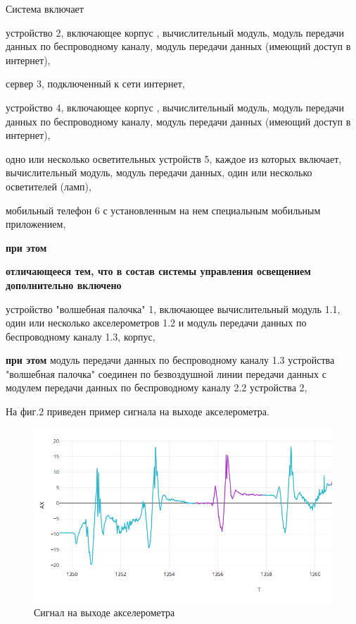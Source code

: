 Система включает 

устройство 2, включающее корпус , вычислительный модуль, модуль передачи данных по беспроводному каналу, модуль передачи данных  (имеющий доступ в интернет),   

сервер 3, подключенный к сети интернет,

устройство 4, включающее корпус , вычислительный модуль, модуль передачи данных по беспроводному каналу, модуль передачи данных  (имеющий доступ в интернет),  

одно или несколько осветительных устройств 5,   каждое из которых включает, вычислительный модуль, модуль передачи данных, один или несколько осветителей (ламп),


мобильный телефон 6 с установленным на нем специальным мобильным приложением,

\textbf{при этом}



\textbf{отличающееся тем, что в состав системы управления освещением дополнительно включено}

устройство "волшебная палочка"  1, включающее  вычислительный модуль 1.1,  один или несколько акселерометров 1.2 и модуль передачи данных по беспроводному каналу 1.3, корпус,

\textbf{при этом }
модуль передачи данных по беспроводному каналу 1.3 устройства "волшебная палочка" соединен по безвоздушной линии передачи данных с модулем передачи данных по беспроводному каналу 2.2 устройства 2,

На фиг.2  приведен пример сигнала на выходе акселерометра.

\begin{figure}[ht]
   \centering
   \includegraphics[scale=.5]{figures/AX-demo.png}
    \caption{Сигнал на выходе акселерометра}
    \label{fig:AX-data}
\end{figure}

